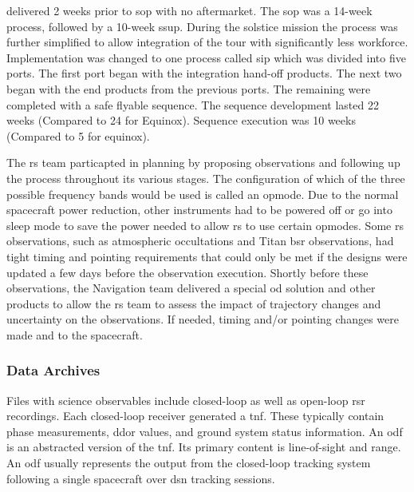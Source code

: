 \documentclass[crop=false,class=article,oneside]{standalone}
\begin{document}
            delivered 2 weeks prior to \gls{sop} with no
            aftermarket. The \gls{sop} was a 14-week process,
            followed by a 10-week \gls{ssup}. During the
            \gls{solstice mission} the process was further
            simplified to allow integration of the tour
            with significantly less workforce. Implementation
            was changed to one process called \gls{sip} which
            was divided into five ports. The first port began
            with the integration hand-off products. The next
            two began with the end products from the previous
            ports. The remaining were completed with a safe
            flyable sequence. The sequence development lasted
            22 weeks (Compared to 24 for Equinox).
            Sequence execution was 10 weeks
            (Compared to 5 for equinox). 
            \par\hfill\par
            The \gls{rs} team particapted in planning by
            proposing observations and following up the
            process throughout its various stages. The
            configuration of which of the three possible
            frequency bands would be used is called an
            \gls{opmode}.
            Due to the normal spacecraft power reduction,
            other instruments had to be powered off or go
            into sleep mode to save the power needed to
            allow \gls{rs} to use certain \glspl{opmode}.
            Some \gls{rs} observations, such as atmospheric
            \glspl{occultation} and Titan \gls{bsr}
            observations, had tight timing and pointing
            requirements that could only be met if the
            designs were updated a few days before the
            observation execution. Shortly before these
            observations, the Navigation team delivered a
            special \gls{od} solution and other products to
            allow the \gls{rs} team to assess the impact of
            trajectory changes and uncertainty on the
            observations. If needed, timing and/or pointing
            changes were made and 
            to the spacecraft.
        \subsubsection{Data Archives}
            Files with science observables include
            \gls{closed-loop} 
            as well as \gls{open-loop} \gls{rsr} recordings.
            Each \gls{closed-loop} receiver generated a
            \gls{tnf}. These typically contain
             \gls{phase}
            measurements, \gls{ddor} values, and ground system
            status information. An \gls{odf} is an abstracted
            version of the \gls{tnf}. Its primary content is
            line-of-sight 
            and range. An \gls{odf} usually represents the
            output from the \gls{closed-loop} tracking system
            following a single spacecraft over
            \gls{dsn} tracking sessions. 
\end{document}
